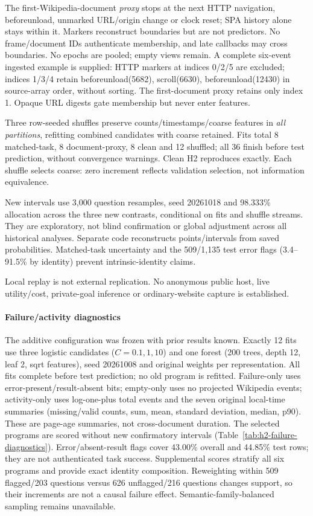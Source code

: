 

The first-Wikipedia-document \emph{proxy} stops at the next HTTP navigation, beforeunload, unmarked URL/origin change or clock reset; SPA history alone stays within it. Markers reconstruct boundaries but are not predictors. No frame/document IDs authenticate membership, and late callbacks may cross boundaries. No epochs are pooled; empty views remain. A complete six-event ingested example is supplied: HTTP markers at indices 0/2/5 are excluded; indices 1/3/4 retain beforeunload(5682), scroll(6630), beforeunload(12430) in source-array order, without sorting. The first-document proxy retains only index 1. Opaque URL digests gate membership but never enter features.

Three row-seeded shuffles preserve counts/timestamps/coarse features in \emph{all partitions}, refitting combined candidates with coarse retained. Fits total 8 matched-task, 8 document-proxy, 8 clean and 12 shuffled; all 36 finish before test prediction, without convergence warnings. Clean H2 reproduces exactly. Each shuffle selects coarse: zero increment reflects validation selection, not information equivalence.



New intervals use 3,000 question resamples, seed 20261018 and 98.333\% allocation across the three new contrasts, conditional on fits and shuffle streams. They are exploratory, not blind confirmation or global adjustment across all historical analyses. Separate code reconstructs points/intervals from saved probabilities. Matched-task uncertainty and the 509/1,135 test error flags (3.4--91.5\% by identity) prevent intrinsic-identity claims.

Local replay is not external replication. No anonymous public host, live utility/cost, private-goal inference or ordinary-website capture is established.

\paragraph{Failure/activity diagnostics}
The additive configuration was frozen with prior results known. Exactly 12 fits use three logistic candidates ($C=0.1,1,10$) and one forest (200 trees, depth 12, leaf 2, sqrt features), seed 20261008 and original weights per representation. All fits complete before test prediction; no old program is refitted. Failure-only uses error-present/result-absent bits; empty-only uses no projected Wikipedia events; activity-only uses log-one-plus total events and the seven original local-time summaries (missing/valid counts, sum, mean, standard deviation, median, p90). These are page-age summaries, not cross-document duration. The selected programs are scored without new confirmatory intervals (Table~\ref{tab:h2-failure-diagnostics}). Error/absent-result flags cover 43.00\% overall and 44.85\% test rows; they are not authenticated task success. Supplemental scores stratify all six programs and provide exact identity composition. Reweighting within 509 flagged/203 questions versus 626 unflagged/216 questions changes support, so their increments are not a causal failure effect. Semantic-family-balanced sampling remains unavailable.

